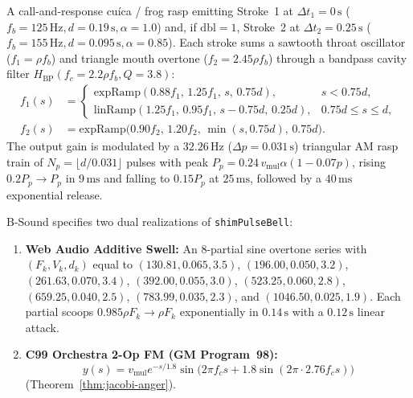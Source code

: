 \begin{definition}
A call-and-response cu\'ica / frog rasp emitting Stroke~1 at $\Delta t_1 = 0\,\text{s}$ ($f_b = 125\,\text{Hz}, d = 0.19\,\text{s}, \alpha = 1.0$) and, if $\mathrm{dbl} = 1$, Stroke~2 at $\Delta t_2 = 0.25\,\text{s}$ ($f_b = 155\,\text{Hz}, d = 0.095\,\text{s}, \alpha = 0.85$). Each stroke sums a sawtooth throat oscillator ($f_1 = \rho f_b$) and triangle mouth overtone ($f_2 = 2.45\rho f_b$) through a bandpass cavity filter $H_{\mathrm{BP}}(f_c = 2.2\rho f_b, Q = 3.8)$:
\begin{align}
f_1(s) &=
\begin{cases}
\mathrm{expRamp}(0.88 f_1,\, 1.25 f_1,\, s,\, 0.75d), & s < 0.75d, \\
\mathrm{linRamp}(1.25 f_1,\, 0.95 f_1,\, s - 0.75d,\, 0.25d), & 0.75d \le s \le d,
\end{cases} \\
f_2(s) &= \mathrm{expRamp}\!\big(0.90 f_2,\, 1.20 f_2,\, \min(s, 0.75d),\, 0.75d\big).
\end{align}
The output gain is modulated by a $32.26\,\text{Hz}$ ($\Delta p = 0.031\,\text{s}$) triangular AM rasp train of $N_p = \lfloor d / 0.031 \rfloor$ pulses with peak $P_p = 0.24\,v_{\mathrm{mul}}\alpha(1 - 0.07p)$, rising $0.2 P_p \to P_p$ in $9\,\text{ms}$ and falling to $0.15 P_p$ at $25\,\text{ms}$, followed by a $40\,\text{ms}$ exponential release.
\end{definition}

\begin{definition}
B-Sound specifies two dual realizations of \texttt{shimPulseBell}:
\begin{enumerate}[leftmargin=1.5em]
  \item \textbf{Web Audio Additive Swell:} An 8-partial sine overtone series with $(F_k, V_k, d_k)$ equal to $(130.81, 0.065, 3.5)$, $(196.00, 0.050, 3.2)$, $(261.63, 0.070, 3.4)$, $(392.00, 0.055, 3.0)$, $(523.25, 0.060, 2.8)$, $(659.25, 0.040, 2.5)$, $(783.99, 0.035, 2.3)$, and $(1046.50, 0.025, 1.9)$. Each partial scoops $0.985\rho F_k \to \rho F_k$ exponentially in $0.14\,\text{s}$ with a $0.12\,\text{s}$ linear attack.
  \item \textbf{C99 Orchestra 2-Op FM (GM Program~98):}
  \[
  y(s) = v_{\mathrm{mul}} e^{-s/1.8}\sin\!\big(2\pi f_c s + 1.8\sin(2\pi \cdot 2.76 f_c s)\big)
  \]
  (Theorem~\ref{thm:jacobi-anger}).
\end{enumerate}
\end{definition}

